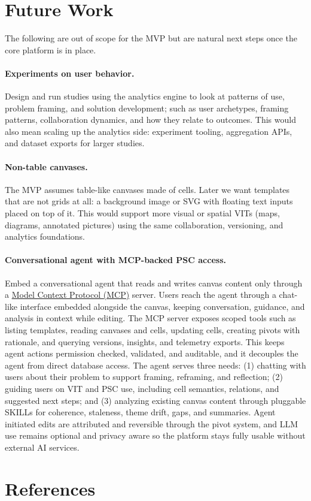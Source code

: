 \documentclass[11pt,a4paper]{article}
\begin{document}
\section{Future Work}

The following are out of scope for the MVP but are natural next steps once the core platform is in place.

\paragraph{Experiments on user behavior.}
Design and run studies using the analytics engine to look at patterns of use, problem framing, and solution development; such as user archetypes, framing patterns, collaboration dynamics, and how they relate to outcomes. This would also mean scaling up the analytics side: experiment tooling, aggregation APIs, and dataset exports for larger studies.

\paragraph{Non-table canvases.}
The MVP assumes table-like canvases made of cells. Later we want templates that are not grids at all: a background image or SVG with floating text inputs placed on top of it. This would support more visual or spatial VITs (maps, diagrams, annotated pictures) using the same collaboration, versioning, and analytics foundations.

\paragraph{Conversational agent with MCP-backed PSC access.}
Embed a conversational agent that reads and writes canvas content only through a \href{https://modelcontextprotocol.io}{Model Context Protocol (MCP)} server. Users reach the agent through a chat-like interface embedded alongside the canvas, keeping conversation, guidance, and analysis in context while editing. The MCP server exposes scoped tools such as listing templates, reading canvases and cells, updating cells, creating pivots with rationale, and querying versions, insights, and telemetry exports. This keeps agent actions permission checked, validated, and auditable, and it decouples the agent from direct database access. The agent serves three needs: (1) chatting with users about their problem to support framing, reframing, and reflection; (2) guiding users on VIT and PSC use, including cell semantics, relations, and suggested next steps; and (3) analyzing existing canvas content through pluggable SKILLs for coherence, staleness, theme drift, gaps, and summaries. Agent initiated edits are attributed and reversible through the pivot system, and LLM use remains optional and privacy aware so the platform stays fully usable without external AI services.

\section{References}

\end{document}
